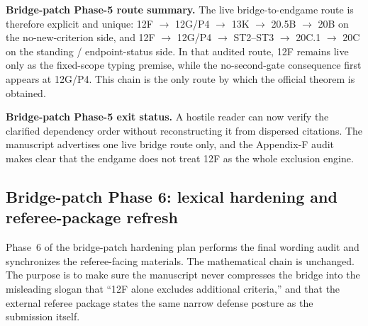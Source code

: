 \noindent\textbf{Bridge-patch Phase-5 route summary.} The live bridge-to-endgame route is therefore explicit and unique: 12F $\to$ 12G/P4 $\to$ 13K $\to$ 20.5B $\to$ 20B on the no-new-criterion side, and 12F $\to$ 12G/P4 $\to$ ST2--ST3 $\to$ 20C.1 $\to$ 20C on the standing / endpoint-status side. In that audited route, 12F remains live only as the fixed-scope typing premise, while the no-second-gate consequence first appears at 12G/P4. This chain is the only route by which the official theorem is obtained.

\noindent\textbf{Bridge-patch Phase-5 exit status.} A hostile reader can now verify the clarified dependency order without reconstructing it from dispersed citations. The manuscript advertises one live bridge route only, and the Appendix-F audit makes clear that the endgame does not treat 12F as the whole exclusion engine.

\subsection*{Bridge-patch Phase 6: lexical hardening and referee-package refresh}\label{sec:bridge-patch-phase6-lexical-audit}
Phase~6 of the bridge-patch hardening plan performs the final wording audit and synchronizes the referee-facing materials. The mathematical chain is unchanged. The purpose is to make sure the manuscript never compresses the bridge into the misleading slogan that ``12F alone excludes additional criteria,'' and that the external referee package states the same narrow defense posture as the submission itself.

